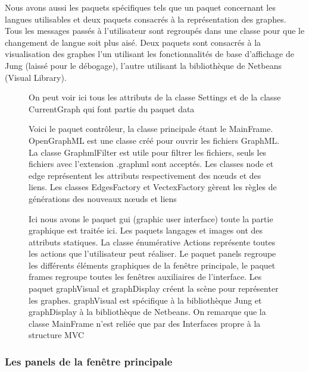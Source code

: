 \documentclass[french]{article}
\begin{document}
    Nous avons aussi les paquets spécifiques tels que un paquet
    concernant les langues utilisables et deux paquets consacrés à la représentation des graphes. Tous les messages passés à l'utilisateur sont
    regroupés dans une classe pour que le changement de langue soit plus
    aisé. Deux paquets sont consacrés à la visualisation des graphes l'un
    utilisant les fonctionnalités de base d'affichage de Jung (laissé
    pour le débogage), l'autre utilisant la bibliothèque de Netbeans (Visual
    Library).
\nopagebreak
    \begin{figure}[h!]
      	\centering
         
      \caption{On peut voir ici tous les attributs de la classe Settings et de la classe CurrentGraph qui font partie du paquet data}
    \end{figure}
\nopagebreak    
    \begin{figure}[h!]
    \centering
      \caption{Voici le paquet contrôleur, la classe principale étant le MainFrame. OpenGraphML est une classe créé pour ouvrir les fichiers GraphML. La classe GraphmlFilter est utile pour filtrer les fichiers, seuls les fichiers avec l’extension .graphml sont acceptés. Les classes node et edge représentent les attributs respectivement des nœuds et des liens. Les classes EdgesFactory et VectexFactory gèrent les règles de générations des nouveaux nœuds et liens }
    \end{figure}
\nopagebreak
    \begin{figure}[h!]
      \caption{Ici nous avons le paquet gui (graphic user interface) toute la partie graphique est traitée ici. Les paquets langages et images ont des attributs statiques. La classe énumérative Actions représente toutes les actions que l'utilisateur peut réaliser. Le paquet panels regroupe les différents éléments graphiques de la fenêtre principale, le paquet frames regroupe toutes les fenêtres auxiliaires de l'interface. Les paquet graphVisual et graphDisplay créent la scène pour représenter les graphes. graphVisual est spécifique à la bibliothèque Jung et graphDisplay à la bibliothèque de Netbeans. On remarque que la classe MainFrame n'est reliée que par des Interfaces propre à la structure MVC }
    \end{figure}
\pagebreak
  \subsubsection*{Les panels de la fenêtre principale}
	
\end{document}
